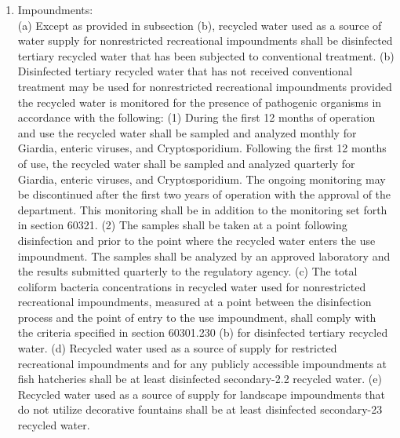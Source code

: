 \begin{enumerate}
(1) Orchards where the recycled water does not come into contact with the edible portion of the crop,
(2) Vineyards where the recycled water does not come into contact with the edible portion of the crop,
(3) Non food-bearing trees (Christmas tree farms are included in this category provided no irrigation with recycled water occurs for a period of 14 days prior to harvesting or allowing access by the general public),
(4) Fodder and fiber crops and pasture for animals not producing milk for human consumption,
(5) Seed crops not eaten by humans,
(6) Food crops that must undergo commercial pathogen-destroying processing before being consumed by humans, and
(7) Ornamental nursery stock and sod farms provided no irrigation with recycled water occurs for a period of 14 days prior to harvesting, retail sale, or allowing access by the general public.
(e) No recycled water used for irrigation, or soil that has been irrigated with recycled water, shall come into contact with the edible portion of food crops eaten raw by humans unless the recycled water complies with subsection (a).
\item Impoundments:\\
(a) Except as provided in subsection (b), recycled water used as a source of water supply for nonrestricted recreational impoundments shall be disinfected tertiary recycled water that has been subjected to conventional treatment.
(b) Disinfected tertiary recycled water that has not received conventional treatment may be used for nonrestricted recreational impoundments provided the recycled water is monitored for the presence of pathogenic organisms in accordance with the following:
(1) During the first 12 months of operation and use the recycled water shall be sampled and analyzed monthly for Giardia, enteric viruses, and Cryptosporidium. Following the first 12 months of use, the recycled water shall be sampled and analyzed quarterly for Giardia, enteric viruses, and Cryptosporidium. The ongoing monitoring may be discontinued after the first two years of operation with the approval of the department. This monitoring shall be in addition to the monitoring set forth in section 60321.
(2) The samples shall be taken at a point following disinfection and prior to the point where the recycled water enters the use impoundment. The samples shall be analyzed by an approved laboratory and the results submitted quarterly to the regulatory agency.
(c) The total coliform bacteria concentrations in recycled water used for nonrestricted recreational impoundments, measured at a point between the disinfection process and the point of entry to the use impoundment, shall comply with the criteria specified in section 60301.230 (b) for disinfected tertiary recycled water.
(d) Recycled water used as a source of supply for restricted recreational impoundments and for any publicly accessible impoundments at fish hatcheries shall be at least disinfected secondary-2.2 recycled water.
(e) Recycled water used as a source of supply for landscape impoundments that do not utilize decorative fountains shall be at least disinfected secondary-23 recycled water.


\end{enumerate}
